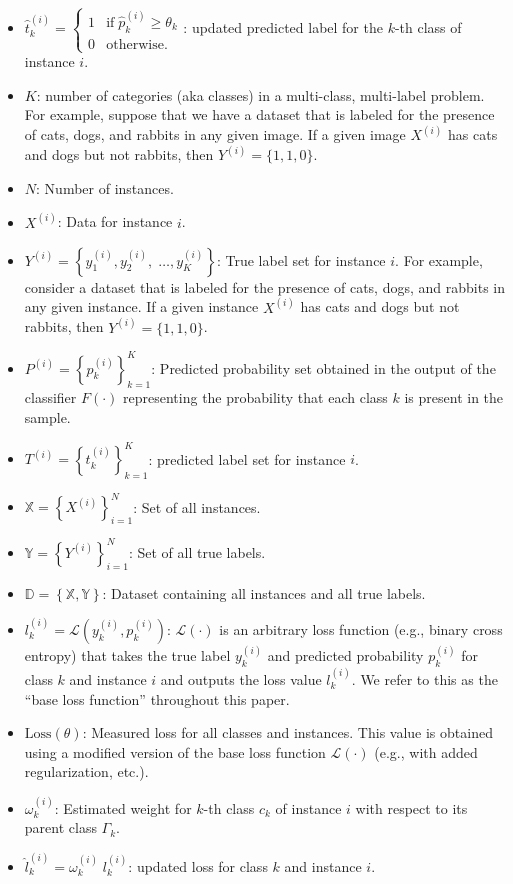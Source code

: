 \documentclass[review,1p,times,numbers]{elsarticle}
\begin{document}
\begin{itemize}
    \item  $\widehat{t}_k^{(i)}=\left\{\begin{array}{ll}1&\text{if}\;\widehat{p}_k^{(i)}\geq\theta_k\\0&\text{otherwise.}\end{array}\right. $: updated predicted label for the $k $-th class of instance $i $.
    \item $K $: number of categories (aka classes) in a multi-class, multi-label problem. For example, suppose that we have a dataset that is labeled for the presence of cats, dogs, and rabbits in any given image. If a given image $X^{(i)} $ has cats and dogs but not rabbits, then $Y^{(i)} = \{1,1,0\} $.
    \item $N $: Number of instances.
    \item $X^{(i)} $: Data for instance $i$.
    \item $Y^{(i)}=\left\{y_1^{(i)},y_2^{(i)},\;\dots,y_{K}^{(i)}\right\} $: True label set for instance $i $. For example, consider a dataset that is labeled for the presence of cats, dogs, and rabbits in any given instance. If a given instance $X^{(i)} $ has cats and dogs but not rabbits, then $Y^{(i)}=\{1,1,0\} $.
    \item $P^{(i)} = {\left\{ p_k^{(i)} \right\}}_{k=1}^{K} $: Predicted probability set obtained in the output of the classifier $F(\cdot) $ representing the probability that each class $k $ is present in the sample.
    \item $T^{(i)} = {\left\{t_k^{(i)}\right\}}_{k=1}^{K} $: predicted label set for instance $i $.
    \item $\mathbb{X} = {\left\{X^{(i)}\right\}}_{i=1}^{N} $: Set of all instances.
    \item $\mathbb{Y} = {\left\{Y^{(i)}\right\}}_{i=1}^{N} $: Set of all true labels.
    \item $\mathbb{D}=\left\{\mathbb{X},\mathbb{Y}\right\} $: Dataset containing all instances and all true labels.
    \item $l_k^{(i)} = \mathcal{L} \left(y_k^{(i)},p_k^{(i)}\right) $:  $\mathcal{L}( \cdot) $ is an arbitrary loss function (e.g., binary cross entropy) that takes the true label $y_k^{(i)}$ and predicted probability $p_k^{(i)}$ for class $k$ and instance $i$ and outputs the loss value $l_k^{(i)} $. We refer to this as the ``base loss function'' throughout this paper.
    \item $\text{Loss}(\theta) $: Measured loss for all classes and instances. This value is obtained using a modified version of the base loss function $\mathcal{L}(\cdot) $ (e.g., with added regularization, etc.).
    \item $\omega_k^{(i)} $: Estimated weight for $k$-th class $c_k $ of instance $i $ with respect to its parent class $\Gamma_k $.
    \item ${\widehat l}_k^{(i)} = \omega_k^{(i)} \; l_k^{(i)} $: updated loss for class $k $ and instance $i $.
\end{itemize}
\end{document}
